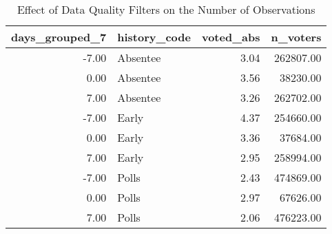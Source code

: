 \begin{table}[!htb]
\centering
\caption{Effect of Data Quality Filters on the Number of Observations} 
\label{table:tab11}
\begingroup\small
\begin{tabular}{rlrr}
  \hline
days\_grouped\_7 & history\_code & voted\_abs & n\_voters \\ 
  \hline
-7.00 & Absentee & 3.04 & 262807.00 \\ 
  0.00 & Absentee & 3.56 & 38230.00 \\ 
  7.00 & Absentee & 3.26 & 262702.00 \\ 
  -7.00 & Early & 4.37 & 254660.00 \\ 
  0.00 & Early & 3.36 & 37684.00 \\ 
  7.00 & Early & 2.95 & 258994.00 \\ 
  -7.00 & Polls & 2.43 & 474869.00 \\ 
  0.00 & Polls & 2.97 & 67626.00 \\ 
  7.00 & Polls & 2.06 & 476223.00 \\ 
   \hline
\end{tabular}
\endgroup
\end{table}
